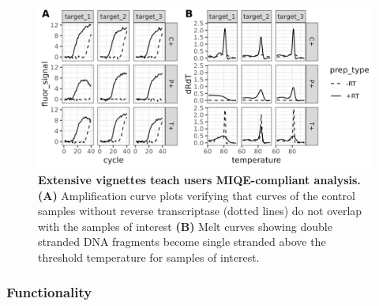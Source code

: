\documentclass{SBCbookchapter}
\begin{document}
\begin{figure}[t]

{\centering \includegraphics[width=1\linewidth]{figures/example_melt_and_curve_plots.png} 

}

\caption{\textbf{Extensive vignettes teach users MIQE-compliant analysis.} \textbf{(A)} Amplification curve plots verifying that curves of the control samples without reverse transcriptase (dotted lines) do not overlap with the samples of interest \textbf{(B)} Melt curves showing double stranded DNA fragments become single stranded above the threshold temperature for samples of interest.} \label{fig:plate-amp-curves}
\end{figure}



\subsubsection{Functionality}
\end{document}
